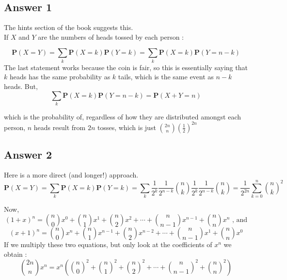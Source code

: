 \documentclass[a4paper,10pt]{article}
\begin{document}
\begin{flushleft}
\subsection{Answer 1}
The hints section of the book suggests this.\\
If $X$ and $Y$ are the numbers of heads tossed by each person :

\begin{equation*} 
\mathbf{P}(X = Y) = \sum_k \mathbf{P}(X = k)\mathbf{P}(Y = k) =  \sum_k \mathbf{P}(X = k)\mathbf{P}(Y = n - k)  
\end{equation*}
The last statement works because the coin is fair, so this is essentially saying that $k$ heads has the same probability as $k$ tails, which is the same event as $n - k$ heads. 
But,
\begin{equation*} 
\sum_k \mathbf{P}(X = k)\mathbf{P}(Y = n - k) =   \mathbf{P}(X + Y = n)
\end{equation*}

which is the probability of, regardless of how they are distributed amongst each person, $n$ heads result from $2n$ tosses, which is just  $\binom{2n}{n}\left(\frac{1}{2}\right)^{2n}$

\subsection{Answer 2}
Here is a more direct (and longer!) approach.
\begin{equation*} 
\mathbf{P}(X = Y) = \sum_k \mathbf{P}(X = k)\mathbf{P}(Y = k) = 
 \sum_k \frac{1}{2^k}\frac{1}{2^{n-k}} \binom{n}{k} \frac{1}{2^k}\frac{1}{2^{n-k}} \binom{n}{k} 
  = \frac{1}{2^{2n}}\sum_{k=0}^n \binom{n}{k}^2
\end{equation*}

Now,
\begin{equation*}
(1 + x)^n = \binom{n}{0}x^0 + \binom{n}{1}x^1 + \binom{n}{2}x^2 + \cdots + \binom{n}{n-1}x^{n-1} + \binom{n}{n}x^n  \text{ , and}   
\end{equation*}
\begin{equation*}
(x + 1)^n = \binom{n}{0}x^n + \binom{n}{1}x^{n-1} + \binom{n}{2}x^{n-2} + \cdots + \binom{n}{n-1}x^1 + \binom{n}{n}x^0   
\end{equation*}
If we multiply these two equations, but only look at the coefficients of $x^n$ we obtain : 
\begin{equation*}
\binom{2n}{n} x^n = x^n\left(\binom{n}{0}^2 + \binom{n}{1}^2 + \binom{n}{2}^2 + \cdots + \binom{n}{n-1}^2 + \binom{n}{n}^2 \right) 
\end{equation*}


\end{flushleft}
\end{document}
